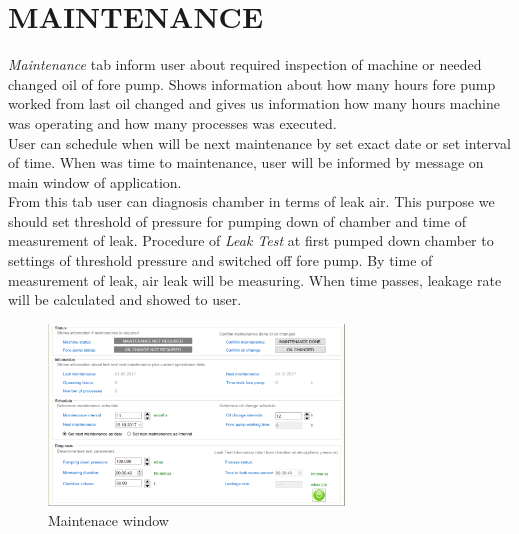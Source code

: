 \section {MAINTENANCE}

\textit{Maintenance} tab inform user about required inspection of machine or needed changed oil of fore pump. Shows information about how many hours fore pump worked from last oil changed and gives us information how many hours machine was  operating and how many processes was executed.\\

User can schedule when will be next maintenance by set exact date or set interval of time. When was time to maintenance, user will be informed by message on main window of application.\\

From this tab user can diagnosis chamber in terms of leak air. This purpose we should set threshold of pressure for pumping down of chamber and time of measurement of leak. Procedure of \textit{Leak Test} at first pumped down chamber to settings of threshold pressure and switched off fore pump. By time of measurement of leak, air leak will be measuring. When time passes, leakage rate will be calculated and showed to user.

	\begin{figure}[!h] 
	\centering \includegraphics[width=0.7\textwidth]{Graphic/Maintenace/MaintenaceWindow.png}	
	\caption{Maintenace window}
	\label{maintenace_window}
	\end{figure}
	\FloatBarrier
